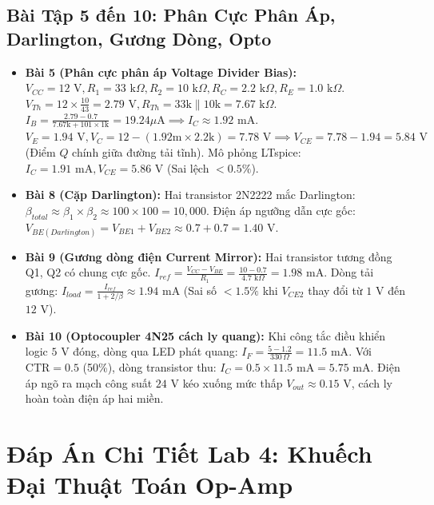 \documentclass[12pt,a4paper]{report}
\begin{document}
\section{Bài Tập 5 đến 10: Phân Cực Phân Áp, Darlington, Gương Dòng, Opto}
\begin{itemize}
    \item \textbf{Bài 5 (Phân cực phân áp Voltage Divider Bias):} $V_{CC} = 12\text{ V}, R_1 = 33\text{ k}\Omega, R_2 = 10\text{ k}\Omega, R_C = 2.2\text{ k}\Omega, R_E = 1.0\text{ k}\Omega$.
    $V_{Th} = 12 \times \frac{10}{43} = 2.79\text{ V}, R_{Th} = 33\text{k} \parallel 10\text{k} = 7.67\text{ k}\Omega$.
    $I_B = \frac{2.79 - 0.7}{7.67\text{k} + 101 \times 1\text{k}} = 19.24\mu\text{A} \implies I_C \approx 1.92\text{ mA}$.
    $V_E = 1.94\text{ V}, V_C = 12 - (1.92\text{m} \times 2.2\text{k}) = 7.78\text{ V} \implies V_{CE} = 7.78 - 1.94 = 5.84\text{ V}$ (Điểm $Q$ chính giữa đường tải tĩnh). Mô phỏng LTspice: $I_C = 1.91\text{ mA}, V_{CE} = 5.86\text{ V}$ (Sai lệch $<0.5\%$).
    \item \textbf{Bài 8 (Cặp Darlington):} Hai transistor 2N2222 mắc Darlington: $\beta_{total} \approx \beta_1 \times \beta_2 \approx 100 \times 100 = 10,000$. Điện áp ngưỡng dẫn cực gốc: $V_{BE(Darlington)} = V_{BE1} + V_{BE2} \approx 0.7 + 0.7 = 1.40\text{ V}$.
    \item \textbf{Bài 9 (Gương dòng điện Current Mirror):} Hai transistor tương đồng Q1, Q2 có chung cực gốc. $I_{ref} = \frac{V_{CC} - V_{BE}}{R_1} = \frac{10 - 0.7}{4.7\text{ k}\Omega} = 1.98\text{ mA}$. Dòng tải gương: $I_{load} = \frac{I_{ref}}{1 + 2/\beta} \approx 1.94\text{ mA}$ (Sai số $<1.5\%$ khi $V_{CE2}$ thay đổi từ $1\text{ V}$ đến $12\text{ V}$).
    \item \textbf{Bài 10 (Optocoupler 4N25 cách ly quang):} Khi công tắc điều khiển logic $5\text{ V}$ đóng, dòng qua LED phát quang: $I_F = \frac{5 - 1.2}{330\,\Omega} = 11.5\text{ mA}$. Với $\text{CTR} = 0.5$ (50\%), dòng transistor thu: $I_C = 0.5 \times 11.5\text{ mA} = 5.75\text{ mA}$. Điện áp ngõ ra mạch công suất $24\text{ V}$ kéo xuống mức thấp $V_{out} \approx 0.15\text{ V}$, cách ly hoàn toàn điện áp hai miền.
\end{itemize}

\chapter{Đáp Án Chi Tiết Lab 4: Khuếch Đại Thuật Toán Op-Amp}
\end{document}
